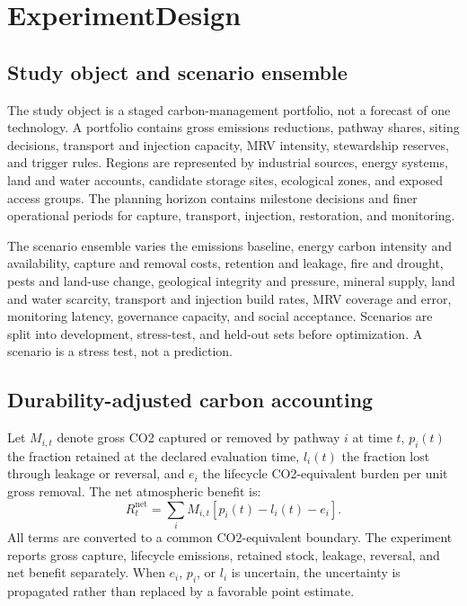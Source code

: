 \documentclass[conference]{IEEEtran}
\begin{document}
\section{ExperimentDesign}
\subsection{Study object and scenario ensemble}
The study object is a staged carbon-management portfolio, not a forecast of one technology. A portfolio contains gross emissions reductions, pathway shares, siting decisions, transport and injection capacity, MRV intensity, stewardship reserves, and trigger rules. Regions are represented by industrial sources, energy systems, land and water accounts, candidate storage sites, ecological zones, and exposed access groups. The planning horizon contains milestone decisions and finer operational periods for capture, transport, injection, restoration, and monitoring.

The scenario ensemble varies the emissions baseline, energy carbon intensity and availability, capture and removal costs, retention and leakage, fire and drought, pests and land-use change, geological integrity and pressure, mineral supply, land and water scarcity, transport and injection build rates, MRV coverage and error, monitoring latency, governance capacity, and social acceptance. Scenarios are split into development, stress-test, and held-out sets before optimization. A scenario is a stress test, not a prediction.

\subsection{Durability-adjusted carbon accounting}
Let $M_{i,t}$ denote gross CO2 captured or removed by pathway $i$ at time $t$, $p_i(t)$ the fraction retained at the declared evaluation time, $l_i(t)$ the fraction lost through leakage or reversal, and $e_i$ the lifecycle CO2-equivalent burden per unit gross removal. The net atmospheric benefit is:
\begin{equation}
R_t^{\mathrm{net}}=\sum_i M_{i,t}\left[p_i(t)-l_i(t)-e_i\right].
\label{eq:netremoval}
\end{equation}
All terms are converted to a common CO2-equivalent boundary. The experiment reports gross capture, lifecycle emissions, retained stock, leakage, reversal, and net benefit separately. When $e_i$, $p_i$, or $l_i$ is uncertain, the uncertainty is propagated rather than replaced by a favorable point estimate.
\end{document}
